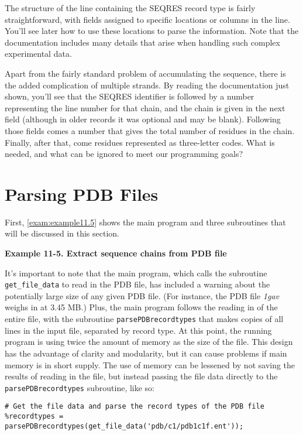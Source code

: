 The structure of the line containing the SEQRES record type is fairly straightforward, with fields assigned to specific locations or columns in the line. You'll see later how to use these locations to parse the information. Note that the documentation includes many details that arise when handling such complex experimental data.

Apart from the fairly standard problem of accumulating the sequence, there is the added complication of multiple strands. By reading the documentation just shown, you'll see that the SEQRES identifier is followed by a number representing the line number for that chain, and the chain is given in the next field (although in older records it was optional and may be blank). Following those fields comes a number that gives the total number of residues in the chain. Finally, after that, come residues represented as three-letter codes. What is needed, and what can be ignored to meet our programming goals? 

\section{Parsing PDB Files}
First, \autoref{exam:example11.5} shows the main program and three subroutines that will be discussed in this section. 

\textbf{Example 11-5. Extract sequence chains from PDB file}


It's important to note that the main program, which calls the subroutine \verb|get_file_data| to read in the PDB file, has included a warning about the potentially large size of any given PDB file. (For instance, the PDB file \textit{1gav} weighs in at 3.45 MB.) Plus, the main program follows the reading in of the entire file, with the subroutine \verb|parsePDBrecordtypes| that makes copies of all lines in the input file, separated by record type. At this point, the running program is using twice the amount of memory as the size of the file. This design has the advantage of clarity and modularity, but it can cause problems if main memory is in short supply. The use of memory can be lessened by not saving the results of reading in the file, but instead passing the file data directly to the \verb|parsePDBrecordtypes| subroutine, like so: 

\begin{lstlisting}
# Get the file data and parse the record types of the PDB file
%recordtypes = parsePDBrecordtypes(get_file_data('pdb/c1/pdb1c1f.ent'));
\end{lstlisting}

